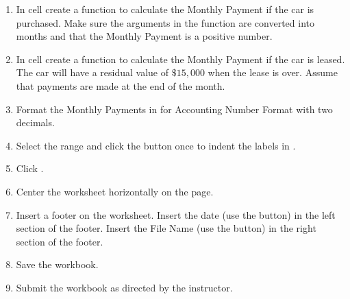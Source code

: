 \begin{enumerate}[resume]
	\item In cell  create a  function to calculate the Monthly Payment if the car is purchased. Make sure the arguments in the  function are converted into months and that the Monthly Payment is a positive number.
	
	\item In cell  create a  function to calculate the Monthly Payment if the car is leased. The car will have a residual value of $ \$15,000 $ when the lease is over. Assume that payments are made at the end of the month.
	
	\item Format the Monthly Payments in  for Accounting Number Format with two decimals.
	
	\item Select the range  and click the  button once to indent the labels in .
	
	\item Click .
	
	\item Center the  worksheet horizontally on the page.
	
	\item Insert a footer on the  worksheet. Insert the date (use the  button) in the left section of the footer. Insert the File Name (use the  button) in the right section of the footer.
	
	\item Save the  workbook.
	
	\item Submit the  workbook as directed by the instructor.
\end{enumerate}